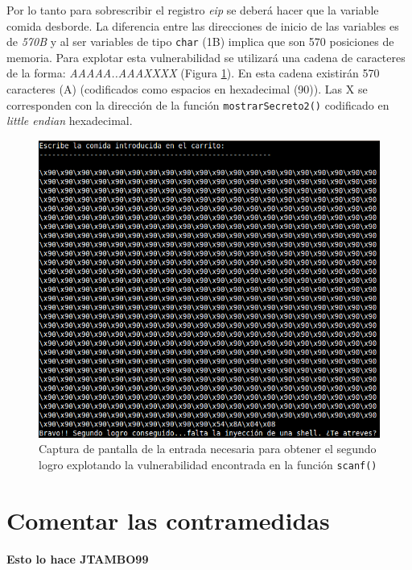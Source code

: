\documentclass[10pt,a4paper]{article}
\begin{document}
Por lo tanto para sobrescribir el registro \emph{eip} se deberá hacer que la variable comida desborde. La diferencia entre las direcciones de inicio de las variables es de \emph{570B} y al ser variables de tipo \texttt{char} (1B) implica que son 570 posiciones de memoria. Para explotar esta vulnerabilidad se utilizará una cadena de caracteres de la forma: \emph{AAAAA..AAAXXXX} (Figura \ref{fig:inputSegundoLogroScanf}). En esta cadena existirán 570 caracteres (A) (codificados como espacios en hexadecimal (90)). Las X se corresponden con la dirección de la función \texttt{mostrarSecreto2()} codificado en \emph{little endian} hexadecimal.\\

\begin{figure}[h!]
\centering
\includegraphics[scale=0.9]{images/segundo_logro_scanf.png}
\caption{Captura de pantalla de la entrada necesaria para obtener el segundo logro explotando la vulnerabilidad encontrada en la función \texttt{scanf()}}
\label{fig:inputSegundoLogroScanf}
\end{figure}


\section{Comentar las contramedidas}

\textbf{{\Huge Esto lo hace JTAMBO99}}
\end{document}
